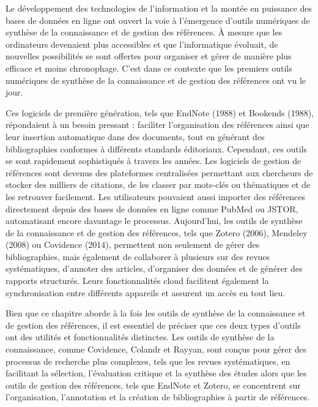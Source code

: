 \documentclass[
  letterpaper,
  DIV=11,
  numbers=noendperiod]{scrreprt}
\begin{document}
Le développement des technologies de l'information et la montée en
puissance des bases de données en ligne ont ouvert la voie à l'émergence
d'outils numériques de synthèse de la connaissance et de gestion des
références. À mesure que les ordinateurs devenaient plus accessibles et
que l'informatique évoluait, de nouvelles possibilités se sont offertes
pour organiser et gérer de manière plus efficace et moins chronophage.
C'est dans ce contexte que les premiers outils numériques de synthèse de
la connaissance et de gestion des références ont vu le jour.

Ces logiciels de première génération, tels que EndNote (1988) et
Bookends (1988), répondaient à un besoin pressant : faciliter
l'organisation des références ainsi que leur insertion automatique dans
des documents, tout en générant des bibliographies conformes à
différents standards éditoriaux. Cependant, ces outils se sont
rapidement sophistiqués à travers les années. Les logiciels de gestion
de références sont devenus des plateformes centralisées permettant aux
chercheurs de stocker des milliers de citations, de les classer par
mots-clés ou thématiques et de les retrouver facilement. Les
utilisateurs pouvaient aussi importer des références directement depuis
des bases de données en ligne comme PubMed ou JSTOR, automatisant encore
davantage le processus. Aujourd'hui, les outils de synthèse de la
connaissance et de gestion des références, tels que Zotero (2006),
Mendeley (2008) ou Covidence (2014), permettent non seulement de gérer
des bibliographies, mais également de collaborer à plusieurs sur des
revues systématiques, d'annoter des articles, d'organiser des données et
de générer des rapports structurés. Leurs fonctionnalités cloud
facilitent également la synchronisation entre différents appareils et
assurent un accès en tout lieu.

Bien que ce chapitre aborde à la fois les outils de synthèse de la
connaissance et de gestion des références, il est essentiel de préciser
que ces deux types d'outils ont des utilités et fonctionnalités
distinctes. Les outils de synthèse de la connaissance, comme Covidence,
Colandr et Rayyan, sont conçus pour gérer des processus de recherche
plus complexes, tels que les revues systématiques, en facilitant la
sélection, l'évaluation critique et la synthèse des études alors que les
outils de gestion des références, tels que EndNote et Zotero, se
concentrent sur l'organisation, l'annotation et la création de
bibliographies à partir de références.
\end{document}

